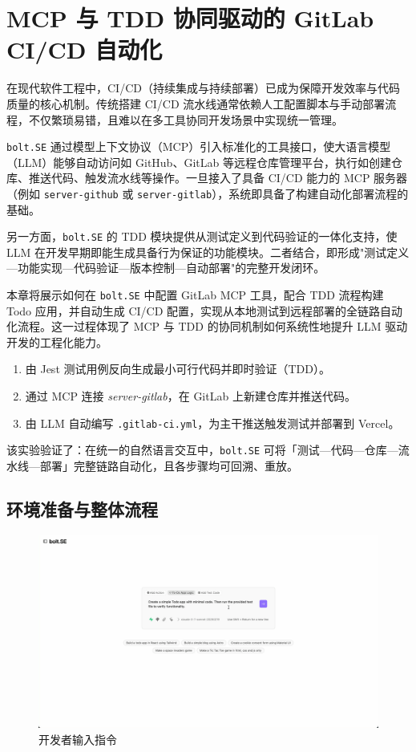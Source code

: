 
\chapter{MCP 与 TDD 协同驱动的 GitLab CI/CD 自动化}
\label{chap:mcp-tdd-cicd}

在现代软件工程中，CI/CD（持续集成与持续部署）已成为保障开发效率与代码质量的核心机制。传统搭建 CI/CD 流水线通常依赖人工配置脚本与手动部署流程，不仅繁琐易错，且难以在多工具协同开发场景中实现统一管理。

\texttt{bolt.SE} 通过模型上下文协议（MCP）引入标准化的工具接口，使大语言模型（LLM）能够自动访问如 GitHub、GitLab 等远程仓库管理平台，执行如创建仓库、推送代码、触发流水线等操作。一旦接入了具备 CI/CD 能力的 MCP 服务器（例如 \texttt{server-github} 或 \texttt{server-gitlab}），系统即具备了构建自动化部署流程的基础。

另一方面，\texttt{bolt.SE} 的 TDD 模块提供从测试定义到代码验证的一体化支持，使 LLM 在开发早期即能生成具备行为保证的功能模块。二者结合，即形成"测试定义—功能实现—代码验证—版本控制—自动部署"的完整开发闭环。

本章将展示如何在 \texttt{bolt.SE} 中配置 GitLab MCP 工具，配合 TDD 流程构建 Todo 应用，并自动生成 CI/CD 配置，实现从本地测试到远程部署的全链路自动化流程。这一过程体现了 MCP 与 TDD 的协同机制如何系统性地提升 LLM 驱动开发的工程化能力。

\begin{enumerate}
  \item 由 Jest 测试用例反向生成最小可行代码并即时验证（TDD）。
  \item 通过 MCP 连接 \emph{server-gitlab}，在 GitLab 上新建仓库并推送代码。
  \item 由 LLM 自动编写 \texttt{.gitlab-ci.yml}，为主干推送触发测试并部署到 Vercel。
\end{enumerate}

该实验验证了：在统一的自然语言交互中，\texttt{bolt.SE} 可将「测试—代码—仓库—流水线—部署」完整链路自动化，且各步骤均可回溯、重放。

\section{环境准备与整体流程}
\label{sec:cicd-overview}

\begin{figure}[htbp]
    \centering
    \includegraphics[width=.8\textwidth]{figures/screenshots/ci-cd/ci_prompt.png}
    \caption{开发者输入指令}
    \label{fig:ci_prompt}
\end{figure}

